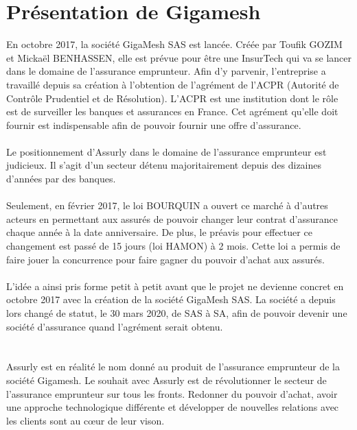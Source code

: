 \section{Présentation de Gigamesh }
En octobre 2017, la société GigaMesh SAS est lancée. Créée par Toufik GOZIM et Micka\"el BENHASSEN, elle est prévue pour être une InsurTech qui va se lancer dans le domaine de l’assurance emprunteur. Afin d’y parvenir, l’entreprise a travaillé depuis sa création à l’obtention de l’agrément de l’ACPR (Autorité de Contrôle Prudentiel et de Résolution). L’ACPR est une institution dont le rôle est de surveiller les banques et assurances en France. Cet agrément qu’elle doit fournir est indispensable afin de pouvoir fournir une offre d’assurance. \\ \\ Le positionnement d’Assurly dans le domaine de l’assurance emprunteur est judicieux. Il s’agit d’un secteur détenu majoritairement depuis des dizaines d’années par des banques. \\ \\ Seulement, en février 2017, le loi BOURQUIN a ouvert ce marché à d’autres acteurs en permettant aux assurés de pouvoir changer leur contrat d’assurance chaque année à la date anniversaire. De plus, le préavis pour effectuer ce changement est passé de 15 jours (loi HAMON) à 2 mois. Cette loi a permis de faire jouer la concurrence pour faire gagner du pouvoir d’achat aux assurés. \\ \\L’idée a ainsi pris forme petit à petit avant que le projet ne devienne concret en octobre 2017 avec la création de la société GigaMesh SAS. La société a depuis lors changé de statut, le 30 mars 2020, de SAS à SA, afin de pouvoir devenir une société d’assurance quand l’agrément serait obtenu. \\\\ \\ Assurly est en réalité le nom donné au produit de l’assurance emprunteur de la société Gigamesh. Le souhait avec Assurly est de révolutionner le secteur de l’assurance emprunteur sur tous les fronts. Redonner du pouvoir d’achat, avoir une approche technologique différente et développer de nouvelles relations avec les clients sont au cœur de leur vison.




